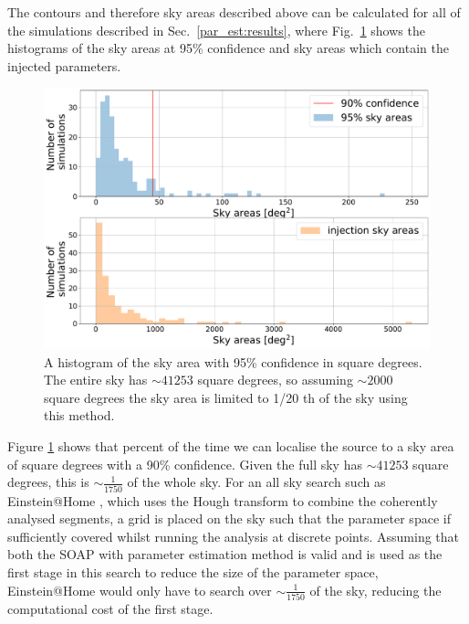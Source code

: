 The contours and therefore sky areas described above can be calculated for all of the simulations described in Sec.~\ref{par_est:results}, where Fig.~\ref{par_est:results:sky_area} shows the histograms of the sky areas at 95\% confidence and sky areas which contain the injected parameters.
%
\begin{figure}[ht]
    \centering
    \includegraphics[width=\linewidth]{C5_parameter/sky_area_hist.pdf}
    \caption[p-p plot for the CW simulations]{A histogram of the sky area with 95\% confidence in square degrees. The entire sky has $\sim 41253$ square degrees, so assuming $\sim 2000$ square degrees  the sky area is limited to 1/20 th of the sky using this method. }
    \label{par_est:results:sky_area}
\end{figure}

Figure \ref{par_est:results:sky_area} shows that  percent of the time we can localise the source to a sky area of  square degrees with a 90\% confidence.
Given the full sky has $\sim 41253$ square degrees, this is $\sim \frac{1}{1750}$ of the whole sky.
For an all sky search such as Einstein@Home \citep{theligoscientificcollaborationandthevirgocollaboration2013EinsteinHome,singh2016ResultsAllsky}, which uses the Hough transform \citep{krishnan2004HoughTransform} to combine the coherently analysed segments, a grid is placed on the sky such that the parameter space if sufficiently covered whilst running the analysis at discrete points. Assuming that both the SOAP with parameter estimation method is valid and is used as the first stage in this search to reduce the size of the parameter space, Einstein@Home would only have to search over $\sim \frac{1}{1750}$ of the sky, reducing the computational cost of the first stage. 



